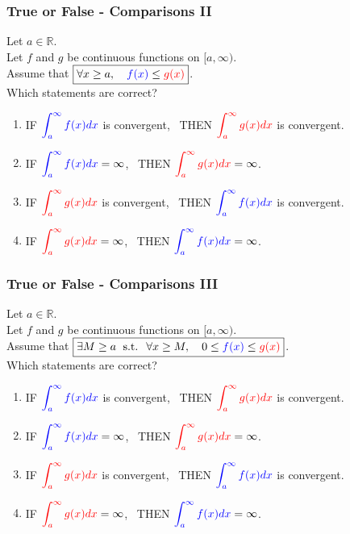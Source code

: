 \documentclass[14pt]{beamer}
\newcommand{\R}{\mathbb{R}}
\newcommand{\azul}[1]{{\color{blue} #1}}
\newcommand{\rojo}[1]{{\color{red} #1}}
\newcommand{\setsize}[1]{\fontsize{#1}{#1}\selectfont} %
\begin{document}
	\begin{frame}[t]
		\setsize{11}
		\frametitle{True or False - Comparisons II}

		Let $a \in \R$. \\ Let $f$ and $g$ be continuous functions on $[a, \infty)$.
		\\ Assume that ${\displaystyle \boxed{\forall x \geq a, \quad \azul{f(x)} \leq \rojo{g(x)}}}$.
		\\ Which statements are correct?

		\begin{enumerate}
			\item IF ${\displaystyle \azul{\int_a^{\infty} f(x) dx}}$ is convergent,
				\, THEN ${\displaystyle \rojo{\int_a^{\infty} g(x) dx}}$ is convergent.

			\item IF ${\displaystyle \azul{\int_a^{\infty} f(x) dx} = \infty}$, \,
				THEN ${\displaystyle \rojo{\int_a^{\infty} g(x) dx} = \infty}$.

			\item IF ${\displaystyle \rojo{\int_a^{\infty} g(x) dx}}$ is convergent,
				\, THEN ${\displaystyle \azul{\int_a^{\infty} f(x) dx}}$ is convergent.

			\item IF ${\displaystyle \rojo{\int_a^{\infty} g(x) dx} = \infty}$, \,
				THEN ${\displaystyle \azul{\int_a^{\infty} f(x) dx} = \infty}$.
		\end{enumerate}
	\end{frame}
	\begin{frame}[t]
		\setsize{11}
		\frametitle{True or False - Comparisons III}

		Let $a \in \R$. \\ Let $f$ and $g$ be continuous functions on $[a, \infty)$.
		\\ Assume that ${\displaystyle \boxed{\exists M \geq a \; \mbox{ s.t. } \; \forall x \geq M, \quad 0 \leq \azul{f(x)} \leq \rojo{g(x)}}}$.
		\\ Which statements are correct?

		\begin{enumerate}
			\item IF ${\displaystyle \azul{\int_a^{\infty} f(x) dx}}$ is convergent,
				\, THEN ${\displaystyle \rojo{\int_a^{\infty} g(x) dx}}$ is convergent.

			\item IF ${\displaystyle \azul{\int_a^{\infty} f(x) dx} = \infty}$, \,
				THEN ${\displaystyle \rojo{\int_a^{\infty} g(x) dx} = \infty}$.

			\item IF ${\displaystyle \rojo{\int_a^{\infty} g(x) dx}}$ is convergent,
				\, THEN ${\displaystyle \azul{\int_a^{\infty} f(x) dx}}$ is convergent.

			\item IF ${\displaystyle \rojo{\int_a^{\infty} g(x) dx} = \infty}$, \,
				THEN ${\displaystyle \azul{\int_a^{\infty} f(x) dx} = \infty}$.
		\end{enumerate}
	\end{frame}
\end{document}
